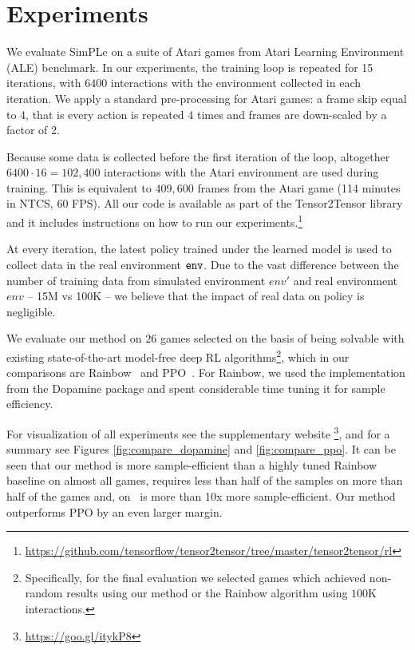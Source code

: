 \section{Experiments}
\label{sec:experiments}

We evaluate SimPLe on a suite of Atari games from Atari Learning Environment (ALE) benchmark.
In our experiments, the training loop is repeated for 15 iterations, with $6400$ interactions with the environment collected in each iteration.
We apply a standard pre-processing for Atari games: a frame skip equal to 4, that is every action
is repeated 4 times and frames are down-scaled by a factor of 2.

Because some data is collected before the first iteration of the loop,
altogether $6400 \cdot 16 = 102,400$ interactions with the Atari environment are used during training.
This is equivalent to $409,600$ frames from the Atari game (114 minutes in NTCS, 60 FPS).
All our code is available as part of the Tensor2Tensor library and it includes instructions on how
to run our experiments.\footnote{\url{https://github.com/tensorflow/tensor2tensor/tree/master/tensor2tensor/rl}} 

At every iteration, the latest policy trained under the learned model is used to collect data in the real environment ${\texttt{env}}$.
Due to the vast difference between the number of training data from simulated environment $env'$ and real environment $env$ -- 15M vs 100K
-- we believe that the impact of real data on policy is negligible.

 We evaluate our method on $26$ games selected on the basis of being solvable with existing state-of-the-art model-free deep RL algorithms\footnote{Specifically, for the final evaluation we selected games which achieved non-random results using our method or the Rainbow algorithm using $100$K interactions.}, which in our comparisons are Rainbow~\cite{rainbow} and PPO~\cite{ppo}.
 For Rainbow, we used the implementation from the Dopamine package and spent considerable
 time tuning it for sample efficiency.

For visualization of all experiments see the supplementary website \footnote{\url{https://goo.gl/itykP8}},
and for a summary see Figures \ref{fig:compare_dopamine} and  \ref{fig:compare_ppo}.
It can be seen that our method is more sample-efficient than a highly tuned Rainbow baseline on almost all games, requires less than half of the samples on more than half of the games and, on \freeway\, is more than 10x more sample-efficient. Our method outperforms PPO by an even larger margin.